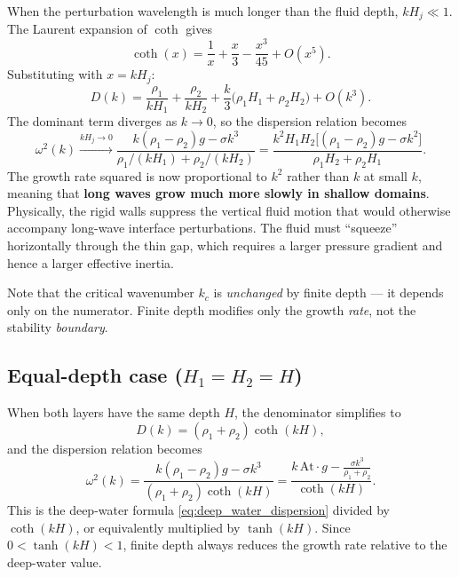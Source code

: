 \documentclass[11pt,a4paper]{article}
\begin{document}
When the perturbation wavelength is much longer than the fluid depth, $kH_j\ll 1$.  The Laurent expansion of $\coth$ gives
\begin{equation}
    \coth(x) = \frac{1}{x} + \frac{x}{3} - \frac{x^3}{45} + O(x^5).
    \label{eq:coth_shallow_expansion}
\end{equation}
Substituting with $x=kH_j$:
\begin{equation}
    D(k) = \frac{\rho_1}{kH_1} + \frac{\rho_2}{kH_2}
    + \frac{k}{3}\bigl(\rho_1 H_1 + \rho_2 H_2\bigr) + O(k^3).
\end{equation}
The dominant term diverges as $k\to 0$, so the dispersion relation becomes
\begin{equation}
    \omega^2(k) \xrightarrow{kH_j\to 0}
    \frac{k(\rho_1-\rho_2)g - \sigma k^3}{\rho_1/(kH_1)+\rho_2/(kH_2)}
    =
    \frac{k^2 H_1 H_2\bigl[(\rho_1-\rho_2)g - \sigma k^2\bigr]}{\rho_1 H_2 + \rho_2 H_1}.
    \label{eq:shallow_water_dispersion}
\end{equation}
The growth rate squared is now proportional to $k^2$ rather than $k$ at small $k$, meaning that \textbf{long waves grow much more slowly in shallow domains}.  Physically, the rigid walls suppress the vertical fluid motion that would otherwise accompany long-wave interface perturbations.  The fluid must ``squeeze'' horizontally through the thin gap, which requires a larger pressure gradient and hence a larger effective inertia.

Note that the critical wavenumber $k_c$ is \emph{unchanged} by finite depth --- it depends only on the numerator.  Finite depth modifies only the growth \emph{rate}, not the stability \emph{boundary}.

\subsection{Equal-depth case ($H_1=H_2=H$)}

When both layers have the same depth $H$, the denominator simplifies to
\begin{equation}
    D(k) = (\rho_1+\rho_2)\coth(kH),
\end{equation}
and the dispersion relation becomes
\begin{equation}
    \omega^2(k) = \frac{k(\rho_1-\rho_2)g - \sigma k^3}{(\rho_1+\rho_2)\coth(kH)}
    =
    \frac{k\,\mathrm{At}\cdot g - \frac{\sigma k^3}{\rho_1+\rho_2}}{\coth(kH)}.
    \label{eq:equal_depth_dispersion}
\end{equation}
This is the deep-water formula \eqref{eq:deep_water_dispersion} divided by $\coth(kH)$, or equivalently multiplied by $\tanh(kH)$.  Since $0<\tanh(kH)<1$, finite depth always reduces the growth rate relative to the deep-water value.
\end{document}
